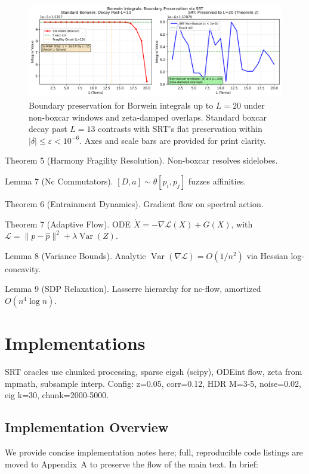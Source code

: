\documentclass{article}
\DeclareMathOperator{\Var}{Var}
\begin{document}
\begin{figure}[H]
\centering
\includegraphics[width=\textwidth]{figure4.png}
\caption{Boundary preservation for Borwein integrals up to $L=20$ under non-boxcar windows and zeta-damped overlaps. Standard boxcar decay past $L=13$ contrasts with SRT's flat preservation within $|\delta| \leq \varepsilon < 10^{-6}$. Axes and scale bars are provided for print clarity.}
\label{fig:borwein}
\end{figure}

Theorem 5 (Harmony Fragility Resolution). Non-boxcar resolves sidelobes.

Lemma 7 (Nc Commutators). $[D,a] \sim \theta [p_i, p_j]$ fuzzes affinities.

Theorem 6 (Entrainment Dynamics). Gradient flow on spectral action.

Theorem 7 (Adaptive Flow). ODE $\dot{X} = -\nabla \mathcal{L}(X) + G(X)$, with $\mathcal{L} = \|p - \hat{p}\|^2 + \lambda \Var(Z)$.

Lemma 8 (Variance Bounds). Analytic $\Var(\nabla \mathcal{L}) = O(1/n^2)$ via Hessian log-concavity.

Lemma 9 (SDP Relaxation). Lasserre hierarchy for nc-flow, amortized $O(n^4 \log n)$.

\section{Implementations}

SRT oracles use chunked processing, sparse eigsh (scipy), ODEint flow, zeta from mpmath, subsample interp. Config: z=0.05, corr=0.12, HDR M=3-5, noise=0.02, eig k=30, chunk=2000-5000.

\subsection{Implementation Overview}

We provide concise implementation notes here; full, reproducible code listings are moved to Appendix~A to preserve the flow of the main text. In brief:
\end{document}
